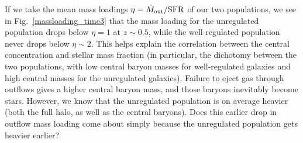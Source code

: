 If we take the mean mass loadings $\eta = \dot M_{\rm out}/\rm{SFR}$ of our two
populations, we see in Fig.~\ref{massloading_time3} that the mass loading for
the unregulated population drops below $\eta=1$ at $z\sim0.5$, while the
well-regulated population never drops below $\eta\sim2$.  This helps explain the
correlation between the central concentration and stellar mass fraction (in
particular, the dichotomy between the two populations, with low central baryon
masses for well-regulated galaxies and high central masses for the unregulated
galaxies).  Failure to eject gas through outflows gives a higher central baryon
mass, and those baryons inevitably become stars.  However, we know that the
unregulated population is on average heavier (both the full halo, as well as the
central baryons).  Does this earlier drop in outflow mass loading come about
simply because the unregulated population gets heavier earlier?

